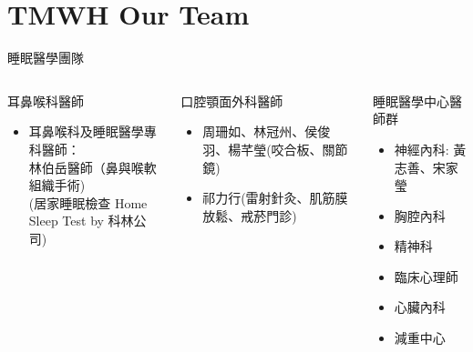 \documentclass[aspectratio=169]{beamer}
\begin{document}
\section{TMWH Our Team}
\begin{frame}{睡眠醫學團隊}

\begin{columns}[onlytextwidth]

\begin{block}{耳鼻喉科醫師}
\begin{itemize}
\vskip0.5cm
\item 耳鼻喉科及睡眠醫學專科醫師：\\
林伯岳醫師（鼻與喉軟組織手術)\\
(居家睡眠檢查 Home Sleep Test by 科林公司)

\vskip0.5cm
\end{itemize}
\vskip1.7cm
~
\end{block}
\vskip1cm 

\begin{block}{口腔顎面外科醫師}
\vskip0.5cm 
\begin{itemize}
\item 周珊如、林冠州、侯俊羽、楊芊瑩(咬合板、關節鏡)
\vskip0.5cm
\item 祁力行(雷射針灸、肌筋膜放鬆、戒菸門診) 

\end{itemize}
\vskip1.7cm
~
\end{block}

\begin{block}{睡眠醫學中心醫師群}
\vskip0.5cm 
\begin{itemize}
\item 神經內科: 黃志善、宋家瑩

\vskip0.5cm
\item 胸腔內科 
\vskip0.5cm
\item 精神科
\item 臨床心理師
\vskip0.5cm
\item 心臟內科
\vskip0.5cm

\item 減重中心

\end{itemize}


\end{block}
\end{columns}
\end{frame}
\end{document}
